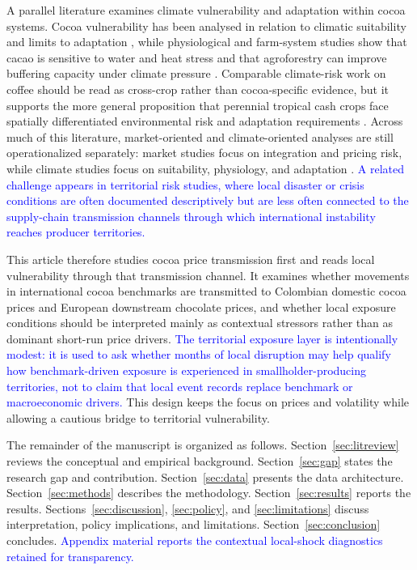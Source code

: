 \documentclass[11pt]{article}
\newcommand{\vTwo}[1]{\textcolor{blue}{#1}}
\begin{document}
A parallel literature examines climate vulnerability and adaptation within cocoa systems. Cocoa vulnerability has been analysed in relation to climatic suitability and limits to adaptation \citep{Schroth2016,Laderach2013}, while physiological and farm-system studies show that cacao is sensitive to water and heat stress and that agroforestry can improve buffering capacity under climate pressure \citep{Lahive2019,Niether2020,Jacobi2013,Vaast2014}. Comparable climate-risk work on coffee should be read as cross-crop rather than cocoa-specific evidence, but it supports the more general proposition that perennial tropical cash crops face spatially differentiated environmental risk and adaptation requirements \citep{Koh2020,Laderach2016}. Across much of this literature, market-oriented and climate-oriented analyses are still operationalized separately: market studies focus on integration and pricing risk, while climate studies focus on suitability, physiology, and adaptation \citep{TsowouGayi2019,Jumah2001,Schroth2016,Lahive2019}. \vTwo{A related challenge appears in territorial risk studies, where local disaster or crisis conditions are often documented descriptively but are less often connected to the supply-chain transmission channels through which international instability reaches producer territories.}

This article therefore studies cocoa price transmission first and reads local vulnerability through that transmission channel. It examines whether movements in international cocoa benchmarks are transmitted to Colombian domestic cocoa prices and European downstream chocolate prices, and whether local exposure conditions should be interpreted mainly as contextual stressors rather than as dominant short-run price drivers. \vTwo{The territorial exposure layer is intentionally modest: it is used to ask whether months of local disruption may help qualify how benchmark-driven exposure is experienced in smallholder-producing territories, not to claim that local event records replace benchmark or macroeconomic drivers.} This design keeps the focus on prices and volatility while allowing a cautious bridge to territorial vulnerability.

The remainder of the manuscript is organized as follows. Section~\ref{sec:litreview} reviews the conceptual and empirical background. Section~\ref{sec:gap} states the research gap and contribution. Section~\ref{sec:data} presents the data architecture. Section~\ref{sec:methods} describes the methodology. Section~\ref{sec:results} reports the results. Sections~\ref{sec:discussion}, \ref{sec:policy}, and \ref{sec:limitations} discuss interpretation, policy implications, and limitations. Section~\ref{sec:conclusion} concludes. \vTwo{Appendix material reports the contextual local-shock diagnostics retained for transparency.}
\end{document}

